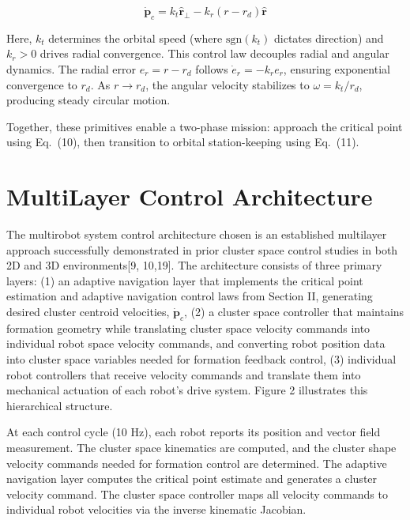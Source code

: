 \documentclass[lettersize,journal]{IEEEtran}
\begin{document}
\begin{equation}
\dot{\mathbf{p}}_c = k_t \hat{\mathbf{r}}_\perp - k_r(r - r_d)\hat{\mathbf{r}}
\end{equation}

Here, $k_t$ determines the orbital speed (where $\text{sgn}(k_t)$ dictates direction) and $k_r > 0$ drives radial convergence.
This control law decouples radial and angular dynamics. The radial error $e_r = r - r_d$ follows $\dot{e}_r = -k_r e_r$, ensuring exponential convergence to $r_d$. As $r \to r_d$, the angular velocity stabilizes to $\omega = k_t/r_d$, producing steady circular motion.

Together, these primitives enable a two-phase mission: approach the critical point using Eq.~(10), then transition to orbital station-keeping using Eq.~(11).




\section{MultiLayer Control Architecture}


The multirobot system control architecture chosen is an established multilayer approach successfully demonstrated in prior cluster space control studies in both 2D and 3D environments[9, 10,19]. The architecture consists of three primary layers: (1) an adaptive navigation layer that implements the critical point estimation and adaptive navigation control laws from Section II, generating desired cluster centroid velocities, $\dot{\mathbf{p}}_c$, (2) a cluster space controller that maintains formation geometry while translating cluster space velocity commands into individual robot space velocity commands, and converting robot position data into cluster space variables needed for formation feedback control, (3) individual robot controllers that receive velocity commands and translate them into mechanical actuation of each robot's drive system. Figure 2 illustrates this hierarchical structure.

At each control cycle (10 Hz), each robot reports its position and vector field measurement. The cluster space kinematics are computed, and the cluster shape velocity commands needed for formation control are determined. The adaptive navigation layer computes the critical point estimate and generates a cluster velocity command. The cluster space controller maps all velocity commands to individual robot velocities via the inverse kinematic Jacobian.
\end{document}

